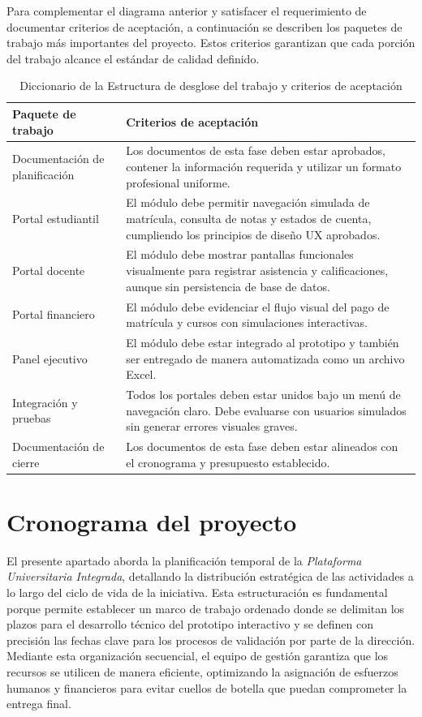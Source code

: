 \documentclass[11pt,spanish]{article}
\begin{document}
Para complementar el diagrama anterior y satisfacer el requerimiento de documentar criterios de aceptación, a continuación se describen los paquetes de trabajo más importantes del proyecto. Estos criterios garantizan que cada porción del trabajo alcance el estándar de calidad definido.

\begin{table}[H]
\centering
\caption{Diccionario de la Estructura de desglose del trabajo y criterios de aceptación}
\label{tab:wbs-diccionario}
{\small
\begin{tabularx}{\textwidth}{p{3.5cm} Y}
\toprule
\textbf{Paquete de trabajo} & \textbf{Criterios de aceptación} \\
\midrule
Documentación de planificación & Los documentos de esta fase deben estar aprobados, contener la información requerida y utilizar un formato profesional uniforme. \\
\midrule
Portal estudiantil & El módulo debe permitir navegación simulada de matrícula, consulta de notas y estados de cuenta, cumpliendo los principios de diseño UX aprobados. \\
\midrule
Portal docente & El módulo debe mostrar pantallas funcionales visualmente para registrar asistencia y calificaciones, aunque sin persistencia de base de datos. \\
\midrule
Portal financiero & El módulo debe evidenciar el flujo visual del pago de matrícula y cursos con simulaciones interactivas. \\
\midrule
Panel ejecutivo & El módulo debe estar integrado al prototipo y también ser entregado de manera automatizada como un archivo Excel. \\
\midrule
Integración y pruebas & Todos los portales deben estar unidos bajo un menú de navegación claro. Debe evaluarse con usuarios simulados sin generar errores visuales graves. \\
\midrule
Documentación de cierre & Los documentos de esta fase deben estar alineados con el cronograma y presupuesto establecido. \\
\bottomrule
\end{tabularx}
}
\end{table}

\newpage
\section{Cronograma del proyecto}

El presente apartado aborda la planificación temporal de la \textit{Plataforma Universitaria Integrada}, detallando la distribución estratégica de las actividades a lo largo del ciclo de vida de la iniciativa. Esta estructuración es fundamental porque permite establecer un marco de trabajo ordenado donde se delimitan los plazos para el desarrollo técnico del prototipo interactivo y se definen con precisión las fechas clave para los procesos de validación por parte de la dirección. Mediante esta organización secuencial, el equipo de gestión garantiza que los recursos se utilicen de manera eficiente, optimizando la asignación de esfuerzos humanos y financieros para evitar cuellos de botella que puedan comprometer la entrega final. 
\end{document}
